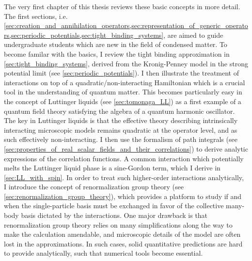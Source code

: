 The very first chapter of this thesis reviews these basic concepts in more detail.
The first sections, i.e. \cref{sec:creation_and_annihilation_operators,sec:representation_of_generic_operators,sec:periodic_potentials,sec:tight_binding_systems}, are aimed to guide undergraduate students which are new in the field of condensed matter.
To become familar with the basics, I review the tight binding approximation in \cref{sec:tight_binding_systems}, derived from the Kronig-Penney model in the strong potential limit (see \cref{sec:periodic_potentials}).
I then illustrate the treatment of interactions on top of a quadratic/non-interacting Hamiltonian which is a crucial tool in the understanding of quantum matter.
This becomes particularly easy in the concept of Luttinger liquids (see \cref{sec:tomonaga_LL}) as a first example of a quantum field theory satisfying the algebra of a quantum harmonic oscillator.
The key in Luttinger liquids is that the effective theory describing intrinsically interacting microscopic models remains quadratic at the operator level, and as such effectively non-interacting.
I then use the formalism of path integrals (see \cref{sec:properties_of_real_scalar_fields_and_their_correlations}) to derive analytic expressions of the correlation functions.
A common interaction which potentially melts the Luttinger liquid phase is a sine-Gordon term, which I derive in \cref{sec:LL_with_spin}.
In order to treat such higher-order interactions analytically, I introduce the concept of renormalization group theory (see \cref{sec:renormalization_group_theory}), which provides a platform to study if and when the single-particle basis must be exchanged in favor of the collective many-body basis dictated by the interactions.
One major drawback is that renormalization group theory relies on many simplifications along the way to make the calculation amendable, and microscopic details of the model are often lost in the approximations.
In such cases, solid quantitative predictions are hard to provide analytically, such that numerical tools become essential.

